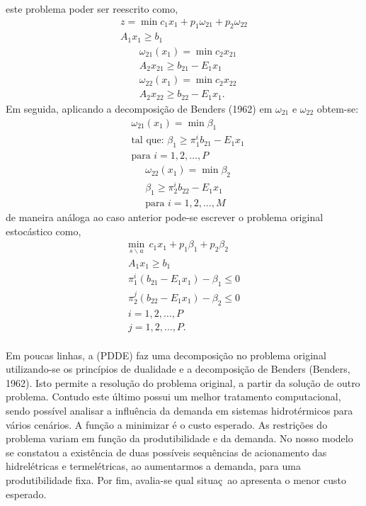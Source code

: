 \documentclass[12pt,fleqn]{article}
\begin{document}
este problema poder ser reescrito como,
\begin{align}
  z = \min  c_1x_1 + p_1{\omega}_{21} + p_2 {\omega}_{22} \nonumber \\	
	A_1 x_1 \geq b_1 
  	\label{pd2}
\end{align}
\begin{align} 
  &\omega_{21}(x_1) =\min c_2x_{21} \nonumber\\
	& A_2 x_{21} \geq b_{21} - E_1 x_1 
      \label{pd3}
\end{align}
\begin{align}
 	&\omega_{22}(x_1) = \min  c_2x_{22} \nonumber\\
	&A_2x_{22} \geq b_{22} - E_1 x_1. 
     \label{pd4}
\end{align}
Em seguida, aplicando a decomposi\c c\~ao de Benders (1962) em $\omega_{21}$ e $\omega_{22}$ obtem-se:  
\begin{align}
&\omega_{21}(x_1) = \min  \beta_{1}\nonumber \\
	&\mbox{tal que: }\beta_{1}  \geq {\pi}_{1}^{i}b_{21} - E_1 x_1 \nonumber\\
	&\mbox{para }i = 1,2,\dots, P 
\end{align}
\begin{align}
 &\omega_{22}(x_1) = \min \beta_{2}\nonumber \\
&\beta_{1}  \geq {\pi}_{2}^{i}b_{22} - E_1 x_1 \nonumber\\
&\mbox{para }i = 1,2,\dots, M 
\end{align}
de maneira an\'aloga ao caso anterior pode-se escrever o problema original estoc\'astico como,
\begin{equation}
  \begin{aligned}
	\underset {s \backslash a} {\text{min}} \ \ c_1x_1 + p_1 {\beta}_{1} + p_2 {\beta}_{2} \\
	A_1 x_1 \geq b_1 \\
	{\pi}_{1}^{i}(b_{21} - E_1x_1) - {\beta}_{1} \leq 0 \\ 
	{\pi}_{2}^{j}(b_{22} - E_1x_1) - {\beta}_{2} \leq 0 \\ 
	i = 1, 2, \dots , P \\
	j = 1, 2, \dots , P. \\
  \end{aligned}
	\label{pd5}
\end{equation}

Em poucas linhas, a (PDDE) faz uma decomposi\c c\~ao no problema original utilizando-se os princ\'ipios de dualidade e a decomposi\c c\~ao
de Benders (Benders, 1962). Isto permite a resolu\c c\~ao do problema original, a partir da solu\c c\~ao de outro problema. Contudo este
\'ultimo possui um melhor tratamento computacional, sendo poss\'ivel analisar a influ\^encia da demanda em sistemas hidrot\'ermicos para v\'arios cen\'arios. A fun\c c\~ao a minimizar  \'e o custo esperado. As restri\c c\~oes do problema variam em fun\c c\~ao da produtibilidade e da demanda. No nosso modelo se constatou a exist\^encia de duas poss\'iveis sequ\^encias de acionamento das hidrel\'etricas e termel\'etricas, ao aumentarmos a demanda, para uma produtibilidade fixa. Por fim, avalia-se qual situa\c c~ao apresenta o menor custo esperado.
\end{document}
